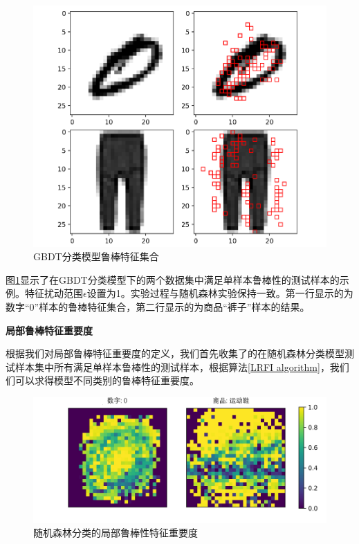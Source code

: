 \begin{figure}[!hbt]
\centering
	\includegraphics[scale=0.5]{fig2/C5/gb/gb_RFS.pdf}
	\caption{GBDT分类模型鲁棒特征集合}
	\label{fig:gb_robust_feature_set}	
\end{figure}

图\ref{fig:gb_robust_feature_set}显示了在GBDT分类模型下的两个数据集中满足单样本鲁棒性的测试样本的示例。特征扰动范围$\epsilon$设置为1。实验过程与随机森林实验保持一致。第一行显示的为数字“0”样本的鲁棒特征集合，第二行显示的为商品“裤子”样本的结果。

\textbf{局部鲁棒特征重要度}

根据我们对局部鲁棒特征重要度的定义，我们首先收集了的在随机森林分类模型测试样本集中所有满足单样本鲁棒性的测试样本，根据算法\ref{LRFI algorithm}，我们们可以求得模型不同类别的鲁棒特征重要度。

\begin{figure}[!hbt]
\centering
	\includegraphics[scale=0.7]{fig2/C5/LBTZ.pdf}
	\caption{随机森林分类的局部鲁棒性特征重要度}
	\label{fig:LRFI}	
\end{figure}

